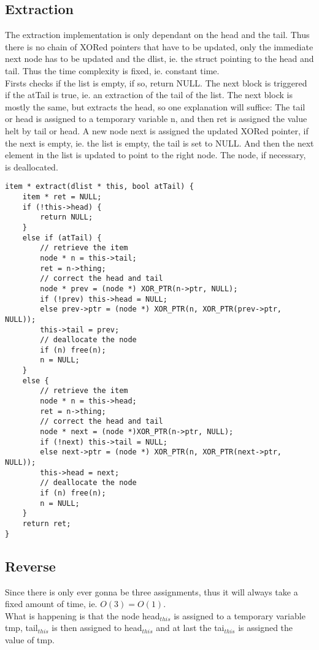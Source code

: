 \documentclass[11pt]{article}
\begin{document}
\subsection{Extraction}
The extraction implementation is only dependant on the head and the tail. Thus
there is no chain of XORed pointers that have to be updated, only the immediate 
next node has to be updated and the dlist, ie. the struct pointing to the head
and tail. Thus the time complexity is fixed, ie. constant time.\\
Firsts checks if the list is empty, if so, return NULL. The next block is
triggered if the atTail is true, ie. an extraction of the tail of the list. The
next block is mostly the same, but extracts the head, so one explanation will
suffice:
The tail or head is assigned to a temporary variable n, and then ret is assigned
the value helt by tail or head. A new node next is assigned the updated XORed
pointer, if the next is empty, ie. the list is empty, the tail is set to NULL. 
And then the next element in the list is updated to point to the right node.
The node, if necessary, is deallocated.
\begin{lstlisting}
item * extract(dlist * this, bool atTail) {
    item * ret = NULL;
    if (!this->head) {
        return NULL;
    }
    else if (atTail) {
        // retrieve the item
        node * n = this->tail;
        ret = n->thing;
        // correct the head and tail
        node * prev = (node *) XOR_PTR(n->ptr, NULL);
        if (!prev) this->head = NULL;
        else prev->ptr = (node *) XOR_PTR(n, XOR_PTR(prev->ptr, NULL));
        this->tail = prev;
        // deallocate the node
        if (n) free(n);
        n = NULL;
    }
    else {
        // retrieve the item
        node * n = this->head;
        ret = n->thing;
        // correct the head and tail
        node * next = (node *)XOR_PTR(n->ptr, NULL);
        if (!next) this->tail = NULL;
        else next->ptr = (node *) XOR_PTR(n, XOR_PTR(next->ptr, NULL));
        this->head = next;
        // deallocate the node
        if (n) free(n);
        n = NULL;
    }
    return ret;
}
\end{lstlisting}

\subsection{Reverse}
Since there is only ever gonna be three assignments, thus it will always take a
fixed amount of time, ie. $O(3) = O(1)$.\\
What is happening is that the node head$_{this}$ is assigned to a temporary
variable tmp, tail$_{this}$ is then assigned to head$_{this}$ and at last the
tai$_{this}$ is assigned the value of tmp.
\end{document}
